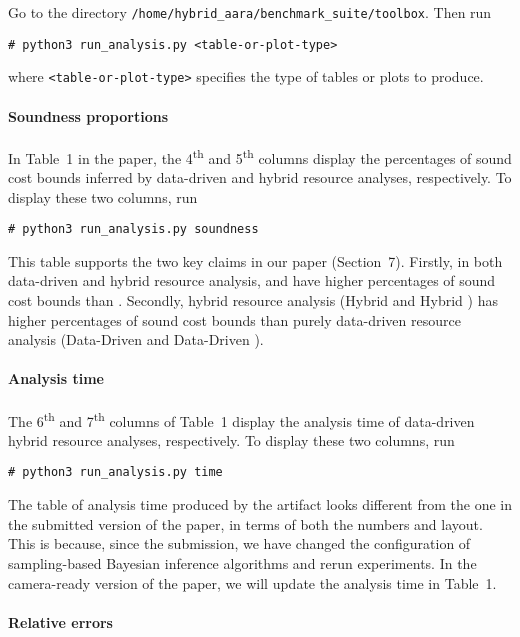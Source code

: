 Go to the directory \texttt{/home/hybrid\_aara/benchmark\_suite/toolbox}.
%
Then run
\begin{verbatim}
# python3 run_analysis.py <table-or-plot-type>
\end{verbatim}
where \texttt{<table-or-plot-type>} specifies the type of tables or plots to
produce.

\paragraph{Soundness proportions}

In Table~1 in the paper, the 4\textsuperscript{th} and 5\textsuperscript{th}
columns display the percentages of sound cost bounds inferred by data-driven and
hybrid resource analyses, respectively.
%
To display these two columns, run
\begin{verbatim}
# python3 run_analysis.py soundness
\end{verbatim}

This table supports the two key claims in our paper (Section~7).
%
Firstly, in both data-driven and hybrid resource analysis, \BayesWC{} and
\BayesPC{} have higher percentages of sound cost bounds than \Opt{}.
%
Secondly, hybrid resource analysis (Hybrid \BayesWC{} and Hybrid \BayesPC{}) has
higher percentages of sound cost bounds than purely data-driven resource
analysis (Data-Driven \BayesWC{} and Data-Driven \BayesPC{}).

\paragraph{Analysis time}

The 6\textsuperscript{th} and 7\textsuperscript{th} columns of Table~1 display
the analysis time of data-driven hybrid resource analyses, respectively.
To display these two columns, run
\begin{verbatim}
# python3 run_analysis.py time
\end{verbatim}

The table of analysis time produced by the artifact looks different from the one
in the submitted version of the paper, in terms of both the numbers and layout.
%
This is because, since the submission, we have changed the configuration of
sampling-based Bayesian inference algorithms and rerun experiments.
%
In the camera-ready version of the paper, we will update the analysis time in
Table~1.

\paragraph{Relative errors}

